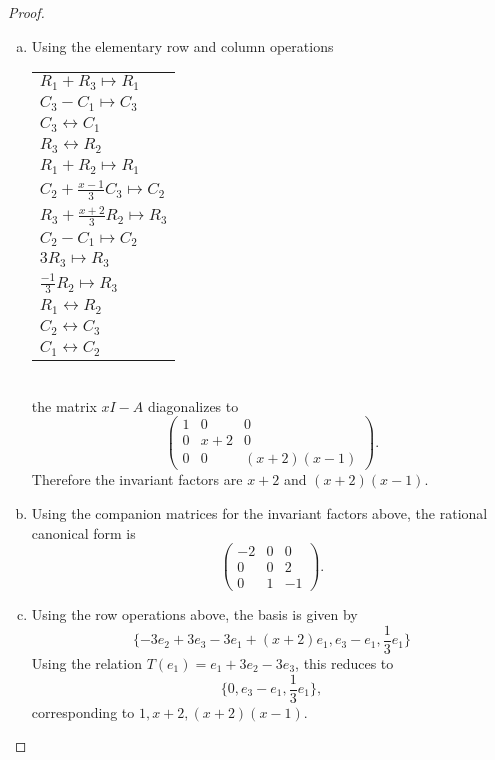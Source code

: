 \documentclass[10pt]{amsart}
\begin{document}
\begin{thm}
  \begin{proof}
    \begin{enumerate}[(a)]
    \item
      Using the elementary row and column operations\\
      \begin{tabular}{l}
        $R_1 + R_3 \mapsto R_1$\\
        $C_3 - C_1 \mapsto C_3$\\
        $C_3 \leftrightarrow C_1$\\
        $R_3 \leftrightarrow R_2$\\
        $R_1 + R_2 \mapsto R_1$\\
        $C_2 + \frac{x - 1}{3}C_3 \mapsto C_2$\\
        $R_3 + \frac{x + 2}{3}R_2 \mapsto R_3$\\
        $C_2 - C_1 \mapsto C_2$\\
        $3R_3 \mapsto R_3$\\
        $\frac{-1}{3}R_2 \mapsto R_3$\\
        $R_1 \leftrightarrow R_2$\\
        $C_2 \leftrightarrow C_3$\\
        $C_1 \leftrightarrow C_2$
      \end{tabular}\\
      the matrix $xI - A$ diagonalizes to 
      $$\left(
      \begin{array}{ccc}
        1 & 0 & 0\\
        0 & x + 2 & 0\\
        0 & 0 & (x+2)(x-1)
      \end{array}
      \right).$$
      Therefore the invariant factors are $x+2$ and $(x+2)(x-1)$.
    \item
      Using the companion matrices for the invariant factors above, the rational canonical form is 
      $$\left(
      \begin{array}{ccc}
        -2 & 0 & 0\\
        0 & 0 & 2\\
        0 & 1 & -1
      \end{array}
      \right).$$
    \item
      Using the row operations above, the basis is given by 
      $$\{-3e_2 + 3e_3 - 3e_1 + (x + 2)e_1, e_3 - e_1, \frac{1}{3}e_1\}$$
      Using the relation $T(e_1) = e_1  + 3e_2 - 3e_3$, this reduces to 
      $$\{0, e_3 - e_1, \frac{1}{3}e_1\},$$
      corresponding to $1, x + 2, (x + 2)(x - 1)$.

\end{enumerate}
\end{proof}
\end{thm}
\end{document}
